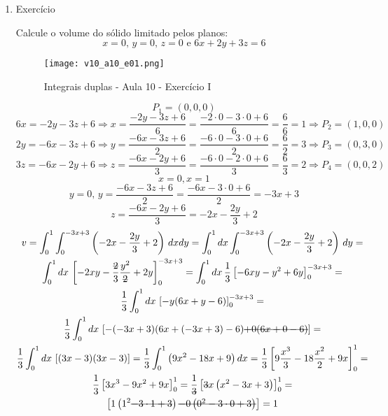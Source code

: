 \begin{enumerate}
	\item Exercício
	
	Calcule o volume do sólido limitado pelos planos:
	\begin{equation*}
		x = 0,\, y = 0,\, z = 0 \textrm{ e } 6x + 2y + 3z = 6
	\end{equation*}
	
	\begin{figure}[htb]
		\caption{Integrais duplas - Aula 10 - Exercício I}
		\label{v10_a10_e01}
		\centering
		\texttt{[image: v10\_a10\_e01.png]}		
	\end{figure}
	
	\begin{equation*}
		P_1 = (0, 0 , 0)	
	\end{equation*}
	\begin{equation*}
		6x = -2y - 3z + 6 \Rightarrow x = \dfrac{-2y - 3z + 6}{6} = \dfrac{-2\cdot0 - 3\cdot0 + 6}{6} = \dfrac{6}{6} = 1 \Rightarrow P_2 = (1,0,0)
	\end{equation*}
	\begin{equation*}
		2y = -6x - 3z + 6 \Rightarrow y = \dfrac{-6x - 3z + 6}{2} = \dfrac{-6\cdot0 - 3\cdot0 + 6}{2} = \dfrac{6}{2} = 3 \Rightarrow P_3 = (0,3,0)
	\end{equation*}
	\begin{equation*}
		3z = -6x - 2y + 6 \Rightarrow z = \dfrac{-6x - 2y + 6}{3} = \dfrac{-6\cdot0 - 2\cdot0 + 6}{3} = \dfrac{6}{3} = 2 \Rightarrow P_4 = (0,0,2)
	\end{equation*}
	\begin{equation*}
		x = 0, x = 1
	\end{equation*}
	\begin{equation*}
		y = 0,\, y = \dfrac{-6x - 3z + 6}{2} = \dfrac{-6x - 3\cdot0 + 6}{2} = -3x + 3
	\end{equation*}
	\begin{equation*}
		z = \dfrac{-6x - 2y + 6}{3} = -2x - \dfrac{2y}{3} + 2
	\end{equation*}
	\begin{gather*}
		v = \int_0^1 \int_0^{-3x + 3} \left(-2x - \dfrac{2y}{3} + 2\right)\, dx dy = \int_0^1 dx \int_0^{-3x + 3} \left(-2x - \dfrac{2y}{3} + 2\right)\, dy =\\ \int_0^1 dx\, \left[-2xy - \dfrac{\overstrike{2}}{3}\dfrac{y^2}{\overstrike{2}} + 2y\right]_0^{-3x + 3} = \int_0^1 dx\, \dfrac{1}{3}\left[-6xy - y^2 + 6y\right]_0^{-3x + 3} =\\ \dfrac{1}{3}\int_0^1 dx\, \left[-y(6x + y - 6)\right]_0^{-3x + 3} =\\ \dfrac{1}{3}\int_0^1 dx\, \left[-(-3x + 3)(6x + (-3x + 3) - 6) \overstrike{+ 0(6x + 0 - 6)}\right] =\\ \dfrac{1}{3}\int_0^1 dx\, \left[(3x-3)(3x - 3)\right] = \dfrac{1}{3}\int_0^1 \left(9x^2 - 18x + 9\right) dx = \dfrac{1}{3}\left[9\dfrac{x^3}{3} - 18 \dfrac{x^2}{2} + 9x\right]_0^1 =\\ \dfrac{1}{3} \left[3x^3 - 9x^2 + 9x\right]_0^1 = \dfrac{1}{\overstrike{3}} \left[\overstrike{3}x\left(x^2 - 3x + 3\right)\right]_0^1 =\\ \left[1\left(1^2 \overstrike{- 3\cdot1 + 3}\right) \overstrike{- 0\left(0^2 - 3\cdot0 + 3\right)}\right] = 1	

\end{gather*}
\end{enumerate}
